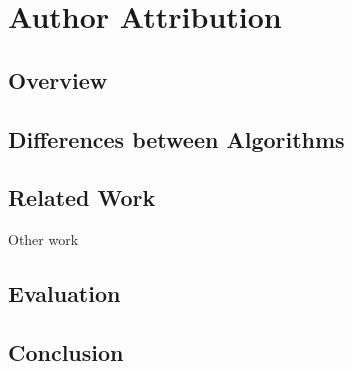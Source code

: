 \chapter{Author Attribution}
\label{ch:diff}



\section{Overview}
    \section{Differences between Algorithms}

\section{Related Work}
    Other work~\cite{White2010,Fong2010}

\section{Evaluation}
\section{Conclusion}


